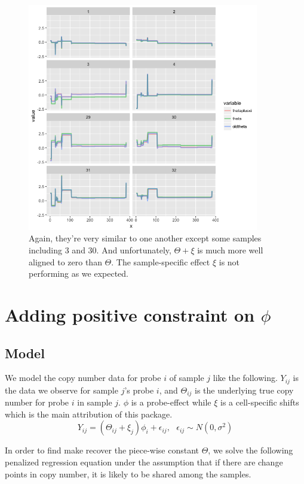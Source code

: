 \documentclass[11pt]{article}
\begin{document}
\begin{figure}[h]
\centering
\includegraphics[width=0.9\textwidth]{thetaonly.png}
\caption{ Again, they're very similar to one another except some samples including 3 and 30. And unfortunately, $\Theta + \xi$ is much more well aligned to zero than $\Theta$. The sample-specific effect $\xi$ is not performing as we expected. }
\label{thetaphi}
\end{figure}

\pagebreak

\section{Adding positive constraint on $\phi$}
\subsection{Model}
\noindent We model the copy number data for probe $i$ of sample $j$ like the following. $Y_{ij}$ is the data we observe for sample $j$'s probe $i$, and $\Theta_{ij}$ is the underlying true copy number for probe $i$ in sample $j$. $\phi$ is a probe-effect while $\xi$ is a cell-specific shifts which is the main attribution of this package. 
\begin{equation}
Y_{ij} = (\Theta_{ij}+\xi_j)\phi_i + \epsilon_{ij}, \text{  } \epsilon_{ij} \sim N(0, \sigma^2)
\end{equation}

\noindent In order to find make recover the piece-wise constant $\Theta$, we solve the following penalized regression equation under the assumption that if there are change points in copy number, it is likely to be shared among the samples. 
\end{document}
